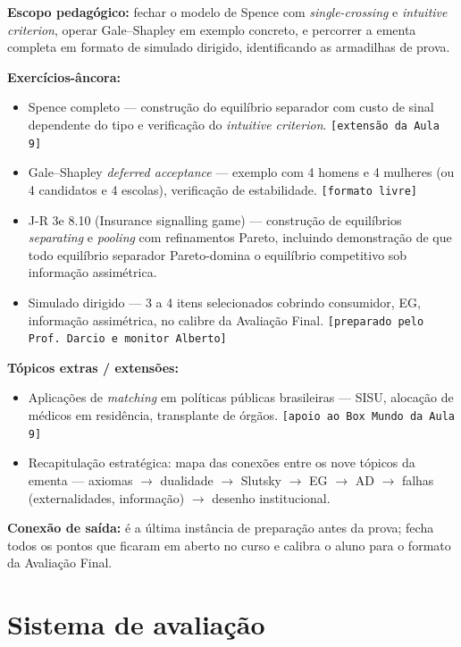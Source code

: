 \documentclass[11pt,a4paper]{article}
\newcommand{\jr}{J-R 3e}
\begin{document}
\textbf{Escopo pedagógico:} fechar o modelo de Spence com \textit{single-crossing} e \textit{intuitive criterion}, operar Gale--Shapley em exemplo concreto, e percorrer a ementa completa em formato de simulado dirigido, identificando as armadilhas de prova.

\textbf{Exercícios-âncora:}
\begin{itemize}
  \item Spence completo --- construção do equilíbrio separador com custo de sinal dependente do tipo e verificação do \textit{intuitive criterion}. \texttt{[extensão da Aula 9]}
  \item Gale--Shapley \textit{deferred acceptance} --- exemplo com 4 homens e 4 mulheres (ou 4 candidatos e 4 escolas), verificação de estabilidade. \texttt{[formato livre]}
  \item \jr{} 8.10 (Insurance signalling game) --- construção de equilíbrios \textit{separating} e \textit{pooling} com refinamentos Pareto, incluindo demonstração de que todo equilíbrio separador Pareto-domina o equilíbrio competitivo sob informação assimétrica.
  \item Simulado dirigido --- 3 a 4 itens selecionados cobrindo consumidor, EG, informação assimétrica, no calibre da Avaliação Final. \texttt{[preparado pelo Prof. Darcio e monitor Alberto]}
\end{itemize}

\textbf{Tópicos extras / extensões:}
\begin{itemize}
  \item Aplicações de \textit{matching} em políticas públicas brasileiras --- SISU, alocação de médicos em residência, transplante de órgãos. \texttt{[apoio ao Box Mundo da Aula 9]}
  \item Recapitulação estratégica: mapa das conexões entre os nove tópicos da ementa --- axiomas $\to$ dualidade $\to$ Slutsky $\to$ EG $\to$ AD $\to$ falhas (externalidades, informação) $\to$ desenho institucional.
\end{itemize}

\textbf{Conexão de saída:} é a última instância de preparação antes da prova; fecha todos os pontos que ficaram em aberto no curso e calibra o aluno para o formato da Avaliação Final.

\section{Sistema de avaliação}
\label{sec:avaliacao}
\end{document}
